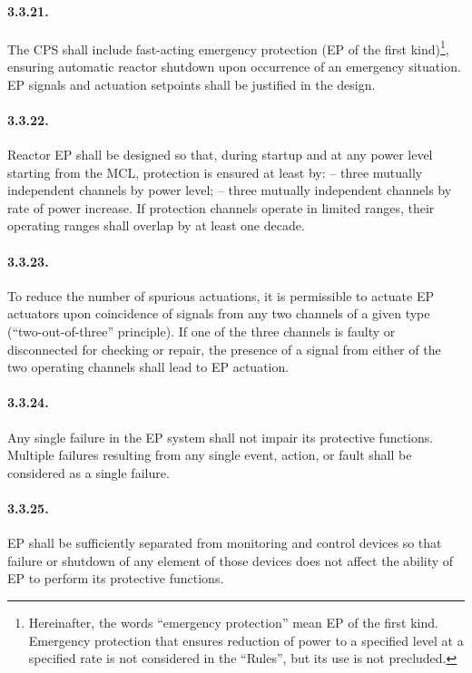 \documentclass[openright]{bookest}
\begin{document}
\paragraph{3.3.21.} The CPS shall include fast-acting emergency protection (EP of the first kind)\footnote{Hereinafter, the words ``emergency protection'' mean EP of the first kind. Emergency protection that ensures reduction of power to a specified level at a specified rate is not considered in the ``Rules'', but its use is not precluded.}, ensuring automatic reactor shutdown upon occurrence of an emergency situation. EP signals and actuation setpoints shall be justified in the design.

\paragraph{3.3.22.} Reactor EP shall be designed so that, during startup and at any power level starting from the MCL, protection is ensured at least by:
-- three mutually independent channels by power level;
-- three mutually independent channels by rate of power increase.
If protection channels operate in limited ranges, their operating ranges shall overlap by at least one decade.

\paragraph{3.3.23.} To reduce the number of spurious actuations, it is permissible to actuate EP actuators upon coincidence of signals from any two channels of a given type (``two-out-of-three'' principle). If one of the three channels is faulty or disconnected for checking or repair, the presence of a signal from either of the two operating channels shall lead to EP actuation.

\paragraph{3.3.24.} Any single failure in the EP system shall not impair its protective functions. Multiple failures resulting from any single event, action, or fault shall be considered as a single failure.

\paragraph{3.3.25.} EP shall be sufficiently separated from monitoring and control devices so that failure or shutdown of any element of those devices does not affect the ability of EP to perform its protective functions.
\end{document}
